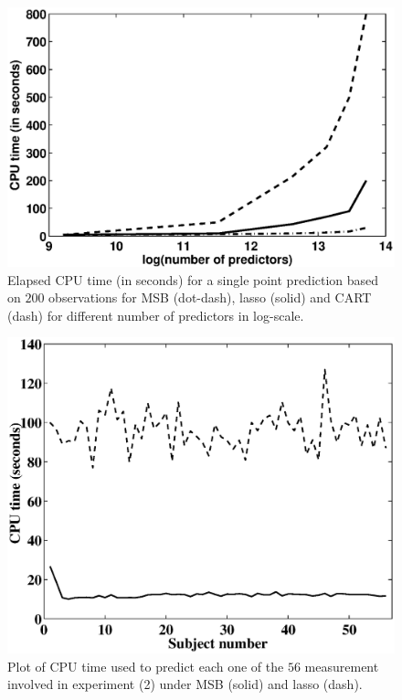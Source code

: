 \documentclass{article} %
\begin{document}
\begin{figure}[h!]
\centering
\includegraphics[width=0.8\linewidth]{plotCPU.eps}
\caption{Elapsed CPU time (in seconds) for a single point prediction based on $200$ observations for MSB (dot-dash), lasso (solid) and CART (dash) for different number of predictors in log-scale.} \label{Cpu}
\end{figure}

\begin{figure}[h!]
\centering
\includegraphics[width=1.0\linewidth]{Time_real2.eps}
\caption{Plot of CPU time used to predict each one of the $56$ measurement involved in experiment (2) under MSB (solid) and lasso (dash).} \label{fig:real}
\end{figure}
\end{document}
